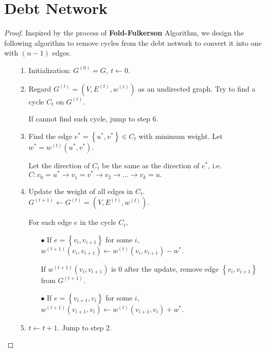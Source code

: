\documentclass{article}
\newcommand{\set}[1]{\left\{#1\right\}}
\begin{document}
\section{Debt Network}
\vspace{1em}
\begin{proof}
    Inspired by the process of \textbf{Fold-Fulkerson} Algorithm, we design the following algorithm to remove cycles from the debt network to convert it into one with $(n-1)$ edges.
    
    \begin{itemize}
        \item[]
        \begin{enumerate}
        \item Initialization: $G^{(0)}=G,\ t\gets0.$
        \item Regard $G^{(t)}=(V,E^{(t)},w^{(t)})$ as an undirected graph. Try to find a cycle $C_t$ on $G^{(t)}$. 
        
        If cannot find such cycle, jump to step 6.
        
        \item Find the edge $e^*=\set{u^*,v^*}\in C_t$ with minimum weight. Let $w^* = w^{(t)}(u^*,v^*).$
        
        Let the direction of $C_t$ be the same as the direction of $e^*$, i.e. $C: v_0=u^*\rightarrow v_1=v^*\rightarrow v_2 \rightarrow...\rightarrow v_k=u.$
        
        \item Update the weight of all edges in $C_t$. $G^{(t+1)}\gets G^{(t)}=(V,E^{(t)},w^{(t)}).$
        
        For each edge $e$ in the cycle $C_t$,
        \begin{itemize}
            \item[$\bullet$] If $e=\set{v_i,v_{i+1}}$ for some $i$, $w^{(t+1)}(v_i,v_{i+1})\gets w^{(t)}(v_i,v_{i+1})-w^*.$
            
            If $w^{(t+1)}(v_i,v_{i+1})$ is $0$ after the update, remove edge $\set{v_i,v_{i+1}}$ from $G^{(t+1)}$.
            \item[$\bullet$] If $e=\set{v_{i+1},v_i}$ for some $i$, $w^{(t+1)}(v_{i+1},v_i)\gets w^{(t)}(v_{i+1},v_i)+w^*$.
        \end{itemize}
        
        \item $t\gets t+1$. Jump to step 2.
        

\end{enumerate}
\end{itemize}
\end{proof}
\end{document}
